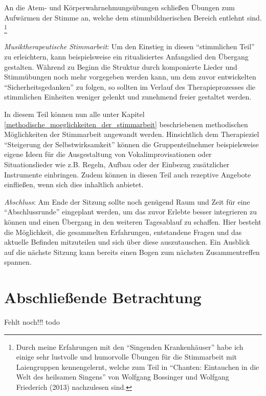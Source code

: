 An die Atem- und Körperwahrnehmungsübungen schließen Übungen zum Aufwärmen der Stimme an, welche dem stimmbildnerischen Bereich entlehnt sind. \footnote{Durch meine Erfahrungen mit den "`Singenden Krankenhäuser"' habe ich einige sehr lustvolle und humorvolle Übungen für die Stimmarbeit mit Laiengruppen kennengelernt, welche zum Teil in "`Chanten: Eintauchen in die Welt des heilsamen Singens"' von Wolfgang Bossinger und Wolfgang Friederich (2013) nachzulesen sind.}

\emph{Musiktherapeutische Stimmarbeit}: 
Um den Einstieg in diesen "`stimmlichen Teil"' zu erleichtern, kann beispielsweise ein ritualisiertes Anfangslied den Übergang gestalten. 
Während zu Beginn die Struktur durch komponierte Lieder und Stimmübungen noch mehr vorgegeben werden kann, um dem zuvor entwickelten "`Sicherheitsgedanken"' zu folgen, so sollten im Verlauf des Therapieprozesses die stimmlichen Einheiten weniger gelenkt und zunehmend freier gestaltet werden. 

In diesem Teil können nun alle unter Kapitel \ref{methodische_moeglichkeiten_der_stimmarbeit} beschriebenen methodischen Möglichkeiten der Stimmarbeit angewandt werden. 
Hinsichtlich dem Therapieziel "`Steigerung der Selbstwirksamkeit"' können die Gruppenteilnehmer beispielsweise eigene Ideen für die Ausgestaltung von Vokalimprovisationen oder Situationslieder wie z.B. Regeln, Aufbau oder der Einbezug zusätzlicher Instrumente einbringen. Zudem können in diesen Teil auch rezeptive Angebote einfließen, wenn sich dies inhaltlich anbietet.

\emph{Abschluss}:
Am Ende der Sitzung sollte noch genügend Raum und Zeit für eine "`Abschlussrunde"' eingeplant werden, um das zuvor Erlebte besser integrieren zu können und einen Übergang in den weiteren Tagesablauf zu schaffen. Hier besteht die Möglichkeit, die gesammelten Erfahrungen, entstandene Fragen und das aktuelle Befinden mitzuteilen und sich über diese auszutauschen. Ein Ausblick auf die nächste Sitzung kann bereits einen Bogen zum nächsten Zusammentreffen spannen.

\section{Abschließende Betrachtung}
Fehlt noch!!! todo




\ifpdf
    \graphicspath{{5_konzept/figures/PNG/}{5_konzept/figures/PDF/}{5_konzept/figures/}}
\else
    \graphicspath{{5_konzept/figures/EPS/}{5_konzept/figures/}}
\fi

\newpage\thispagestyle{empty}
